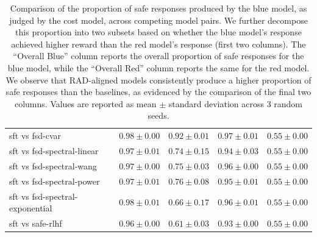 \begin{table}[t]
{\begin{tabular}{>{\centering\arraybackslash}p{4cm} >{\centering\arraybackslash}p{2.5cm} >{\centering\arraybackslash}p{2.5cm} >{\centering\arraybackslash}p{1.5cm} >{\centering\arraybackslash}p{1.5cm}}
      sft vs fsd-cvar                      & $0.98\pm0.00$ & $0.92\pm0.01$ & \underline{\textbf{$0.97\pm0.01$}} & $0.55\pm0.00$ \\
      sft vs fsd-spectral-linear           & $0.97\pm0.01$ & $0.74\pm0.15$ & \underline{\textbf{$0.94\pm0.03$}} & $0.55\pm0.00$ \\
      sft vs fsd-spectral-wang             & $0.97\pm0.00$ & $0.75\pm0.03$ & \underline{\textbf{$0.96\pm0.00$}} & $0.55\pm0.00$ \\
      sft vs fsd-spectral-power            & $0.97\pm0.01$ & $0.76\pm0.08$ & \underline{\textbf{$0.95\pm0.01$}} & $0.55\pm0.00$ \\
      sft vs fsd-spectral-exponential      & $0.98\pm0.01$ & $0.66\pm0.17$ & \underline{\textbf{$0.96\pm0.01$}} & $0.55\pm0.00$ \\
      \midrule
      sft vs safe-rlhf                     & $0.96\pm0.00$ & $0.61\pm0.03$ & \underline{\textbf{$0.93\pm0.00$}} & $0.55\pm0.00$ \\
      \bottomrule
    \end{tabular}
  }
  \caption{
    Comparison of the proportion of safe responses produced by the blue model, as judged by the cost model, across competing model pairs. We further decompose this proportion into two subsets based on whether the blue model's response achieved higher reward than the red model's response (first two columns). The ``Overall Blue'' column reports the overall proportion of safe responses for the blue model, while the ``Overall Red'' column reports the same for the red model. We observe that RAD-aligned models consistently produce a higher proportion of safe responses than the baselines, as evidenced by the comparison of the final two columns. Values are reported as mean $\pm$ standard deviation across 3 random seeds.
  }
  \label{tab:safe-response-prop}
\end{table}


